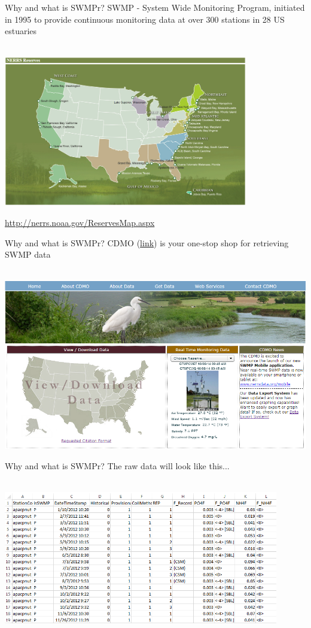 \documentclass[xcolor=dvipsnames]{beamer}\usepackage[]{graphicx}\usepackage[]{color}
\begin{document}
\begin{frame}{Why and what is SWMPr?}
SWMP - System Wide Monitoring Program, initiated in 1995 to provide continuous monitoring data at over 300 stations in 28 US estuaries \\~\\
\centerline{\includegraphics[width = 0.8\textwidth]{imgs/NERRS_locations.png}}
\tiny
\flushright
\href{http://nerrs.noaa.gov/ReservesMap.aspx}{http://nerrs.noaa.gov/ReservesMap.aspx}
\end{frame}

\begin{frame}[t]{Why and what is SWMPr?}
CDMO (\href{http://cdmo.baruch.sc.edu/}{link}) is your one-stop shop for retrieving SWMP data \\~\\
\centerline{\includegraphics[width = \textwidth]{imgs/cdmo_front.png}}
\end{frame}

\begin{frame}{Why and what is SWMPr?}
The raw data will look like this...\\~\\
\centerline{\includegraphics[width = 0.9\textwidth]{imgs/qaqc_ex.png}}
\end{frame}
\end{document}
